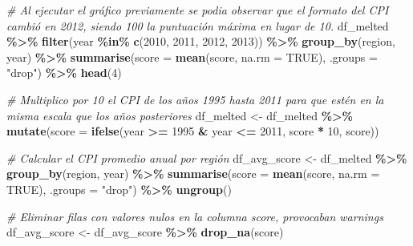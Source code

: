 \documentclass[
]{article}
\newenvironment{Shaded}{\begin{snugshade}}{\end{snugshade}}
\newcommand{\AttributeTok}[1]{\textcolor[rgb]{0.13,0.29,0.53}{#1}}
\newcommand{\CommentTok}[1]{\textcolor[rgb]{0.56,0.35,0.01}{\textit{#1}}}
\newcommand{\ConstantTok}[1]{\textcolor[rgb]{0.56,0.35,0.01}{#1}}
\newcommand{\DecValTok}[1]{\textcolor[rgb]{0.00,0.00,0.81}{#1}}
\newcommand{\FunctionTok}[1]{\textcolor[rgb]{0.13,0.29,0.53}{\textbf{#1}}}
\newcommand{\NormalTok}[1]{#1}
\newcommand{\OtherTok}[1]{\textcolor[rgb]{0.56,0.35,0.01}{#1}}
\newcommand{\SpecialCharTok}[1]{\textcolor[rgb]{0.81,0.36,0.00}{\textbf{#1}}}
\newcommand{\StringTok}[1]{\textcolor[rgb]{0.31,0.60,0.02}{#1}}
\begin{document}
\begin{Shaded}
\begin{Highlighting}[]
\CommentTok{\# Al ejecutar el gráfico previamente se podia observar que el formato del CPI cambió en 2012, siendo 100 la puntuación máxima en lugar de 10.}
\NormalTok{df\_melted }\SpecialCharTok{\%\textgreater{}\%}
    \FunctionTok{filter}\NormalTok{(year }\SpecialCharTok{\%in\%} \FunctionTok{c}\NormalTok{(}\DecValTok{2010}\NormalTok{, }\DecValTok{2011}\NormalTok{, }\DecValTok{2012}\NormalTok{, }\DecValTok{2013}\NormalTok{)) }\SpecialCharTok{\%\textgreater{}\%}
    \FunctionTok{group\_by}\NormalTok{(region, year) }\SpecialCharTok{\%\textgreater{}\%}
    \FunctionTok{summarise}\NormalTok{(}\AttributeTok{score =} \FunctionTok{mean}\NormalTok{(score, }\AttributeTok{na.rm =} \ConstantTok{TRUE}\NormalTok{), }\AttributeTok{.groups =} \StringTok{"drop"}\NormalTok{) }\SpecialCharTok{\%\textgreater{}\%}
    \FunctionTok{head}\NormalTok{(}\DecValTok{4}\NormalTok{)}
    
\CommentTok{\# Multiplico por 10 el CPI de los años 1995 hasta 2011 para que estén en la misma escala que los años posteriores}
\NormalTok{df\_melted }\OtherTok{\textless{}{-}}\NormalTok{ df\_melted }\SpecialCharTok{\%\textgreater{}\%}
    \FunctionTok{mutate}\NormalTok{(}\AttributeTok{score =} \FunctionTok{ifelse}\NormalTok{(year }\SpecialCharTok{\textgreater{}=} \DecValTok{1995} \SpecialCharTok{\&}\NormalTok{ year }\SpecialCharTok{\textless{}=} \DecValTok{2011}\NormalTok{, score }\SpecialCharTok{*} \DecValTok{10}\NormalTok{, score))}

\CommentTok{\# Calcular el CPI promedio anual por región}
\NormalTok{df\_avg\_score }\OtherTok{\textless{}{-}}\NormalTok{ df\_melted }\SpecialCharTok{\%\textgreater{}\%}
    \FunctionTok{group\_by}\NormalTok{(region, year) }\SpecialCharTok{\%\textgreater{}\%}
    \FunctionTok{summarise}\NormalTok{(}\AttributeTok{score =} \FunctionTok{mean}\NormalTok{(score, }\AttributeTok{na.rm =} \ConstantTok{TRUE}\NormalTok{), }\AttributeTok{.groups =} \StringTok{"drop"}\NormalTok{) }\SpecialCharTok{\%\textgreater{}\%}
    \FunctionTok{ungroup}\NormalTok{()}

\CommentTok{\# Eliminar filas con valores nulos en la columna \textquotesingle{}score\textquotesingle{}, provocaban warnings}
\NormalTok{df\_avg\_score }\OtherTok{\textless{}{-}}\NormalTok{ df\_avg\_score }\SpecialCharTok{\%\textgreater{}\%} \FunctionTok{drop\_na}\NormalTok{(score)   }


\end{Highlighting}
\end{Shaded}
\end{document}
